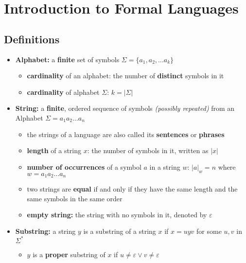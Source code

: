 \documentclass[english]{article}
\begin{document}

\section{Introduction to Formal Languages}


\subsection{Definitions}

\begin{itemize}
  \item \textbf{Alphabet:} a \textbf{finite} set of symbols \(\Sigma = \{a_1, a_2, \ldots a_k\}\)
        \begin{itemize}
          \item \textbf{cardinality} of an alphabet: the number of \textbf{distinct} symbols in it
          \item \textbf{cardinality} of alphabet \(\Sigma\): \(k = \left|\Sigma\right|\)
        \end{itemize}
  \item \textbf{String:} a \textbf{finite}, ordered sequence of symbols \textit{(possibly repeated)} from an Alphabet \(\Sigma = a_1a_2\ldots a_n\)
        \begin{itemize}
          \item the strings of a language are also called its \textbf{sentences} or \textbf{phrases}
          \item \textbf{length} of a string \(x\): the number of symbols in it, written as \(|x|\)
          \item \textbf{number of occurrences} of a symbol \(a\) in a string \(w\): \(\left|a\right|_w = n\) where \(w = a_1a_2\ldots a_n\)
          \item two strings are \textbf{equal} if and only if they have the same length and the same symbols in the same order
          \item \textbf{empty string:} the string with no symbols in it, denoted by \(\varepsilon\)
        \end{itemize}
  \item \textbf{Substring:} a string \(y\) is a substring of a string \(x\) if \(x = uyv\) for some \(u, v\) in \(\Sigma^\ast\)
        \begin{itemize}
          \item \(y\) is a \textbf{proper} substring of \(x\) if \(u \neq \varepsilon \lor v \neq \varepsilon\)

\end{itemize}
\end{itemize}
\end{document}
